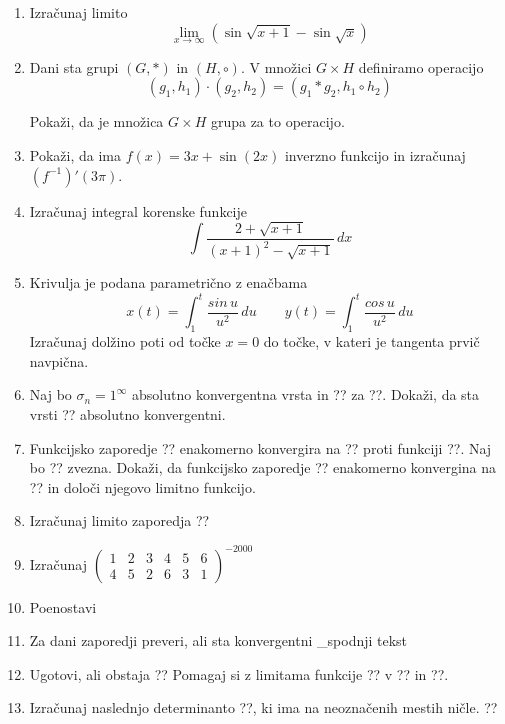 \documentclass[a4paper,12pt]{article}
\begin{document}
\begin{enumerate}
\item
Izračunaj limito $$\lim_{x\to\infty}(\sin\sqrt{x+1}-\sin\sqrt{x}) $$

\item
Dani sta grupi $(G, \ast) $ in $(H, \circ )$. V množici $G \times H$ definiramo operacijo
 $$(g_1,h_1)\cdot (g_2,h_2)=(g_1\ast g_2,h_1 \circ h_2) $$

Pokaži, da je množica  $G \times H$ grupa za to operacijo.

\item
Pokaži, da ima $f(x)=3x+\sin(2x)$ inverzno funkcijo in izračunaj $(f^{-1})'(3\pi)$.

\item
Izračunaj integral korenske funkcije
$$\int \frac{2+\sqrt{x+1}}{(x+1)^2 - \sqrt{x+1}}\,dx $$

\item
Krivulja je podana parametrično z enačbama
$$x(t)=\int_1^t \frac{sin\,u}{u^2}\,du  \qquad y(t)=\int_1^t \frac{cos\,u}{u^2}\,du $$
Izračunaj dolžino poti od točke $x=0$ do točke, v kateri je tangenta prvič navpična.

\item
Naj bo $\sigma_n=1^\infty$ absolutno konvergentna vrsta in ?? za ??.
Dokaži, da sta vrsti
??
absolutno konvergentni.

\item
Funkcijsko zaporedje ?? enakomerno konvergira na ?? proti funkciji ??.
Naj bo ?? zvezna. Dokaži, da funkcijsko zaporedje ??
enakomerno konvergina na ?? in določi njegovo limitno funkcijo.

\item
Izračunaj limito zaporedja
??
\item
Izračunaj
$
\left(
\begin{array}{cccccc}
	1&2&3&4&5&6\\
	4&5&2&6&3&1
\end{array}
\right)^{-2000}
$

\item
Poenostavi
$$
$$

\item
Za dani zaporedji preveri, ali sta konvergentni
_{spodnji tekst}

\item
Ugotovi, ali obstaja
??
Pomagaj si z limitama funkcije ?? v ?? in ??.

\item
Izračunaj naslednjo determinanto ??, ki ima na neoznačenih mestih ničle.
??


\end{enumerate}
\end{document}
